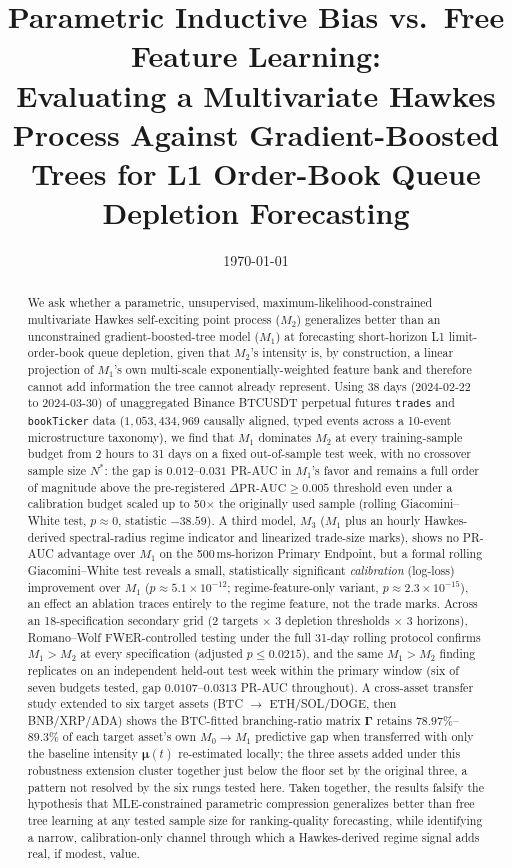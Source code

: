 \documentclass[11pt]{article}
\title{Parametric Inductive Bias vs.\ Free Feature Learning:\\
Evaluating a Multivariate Hawkes Process Against Gradient-Boosted\\
Trees for L1 Order-Book Queue Depletion Forecasting}
\author{%
  \todo{Author name(s) and affiliation(s)}
}
\date{\today}
\newcommand{\PRAUC}{\mathrm{PR\text{-}AUC}}
\begin{document}
\maketitle

\begin{abstract}
We ask whether a parametric, unsupervised, maximum-likelihood-constrained
multivariate Hawkes self-exciting point process ($M_2$) generalizes better
than an unconstrained gradient-boosted-tree model ($M_1$) at forecasting
short-horizon L1 limit-order-book queue depletion, given that $M_2$'s
intensity is, by construction, a linear projection of $M_1$'s own
multi-scale exponentially-weighted feature bank and therefore cannot add
information the tree cannot already represent. Using 38 days
(2024-02-22 to 2024-03-30) of unaggregated Binance BTCUSDT perpetual
futures \texttt{trades} and \texttt{bookTicker} data ($1{,}053{,}434{,}969$
causally aligned, typed events across a 10-event microstructure taxonomy),
we find that $M_1$ dominates $M_2$ at every training-sample budget from
2 hours to 31 days on a fixed out-of-sample test week, with no crossover
sample size $N^{*}$: the gap is $0.012$--$0.031$ PR-AUC in $M_1$'s favor and
remains a full order of magnitude above the pre-registered
$\Delta\PRAUC \ge 0.005$ threshold even under a calibration budget scaled
up to 50$\times$ the originally used sample (rolling Giacomini--White test,
$p \approx 0$, statistic $-38.59$). A third model, $M_3$ ($M_1$ plus an
hourly Hawkes-derived spectral-radius regime indicator and linearized
trade-size marks), shows no PR-AUC advantage over $M_1$ on the
500\,ms-horizon Primary Endpoint, but a formal rolling
Giacomini--White test reveals a small, statistically significant
\emph{calibration} (log-loss) improvement over $M_1$ ($p \approx 5.1\times
10^{-12}$; regime-feature-only variant, $p \approx 2.3\times10^{-15}$), an
effect an ablation traces entirely to the regime feature, not the trade
marks. Across an 18-specification secondary grid (2 targets $\times$ 3
depletion thresholds $\times$ 3 horizons), Romano--Wolf FWER-controlled
testing under the full 31-day rolling protocol confirms $M_1 > M_2$ at
every specification (adjusted $p \le 0.0215$), and the same $M_1>M_2$
finding replicates on an independent held-out test week within the
primary window (six of seven budgets tested, gap $0.0107$--$0.0313$
PR-AUC throughout). A cross-asset transfer study extended to six
target assets (BTC $\to$ ETH/SOL/DOGE, then BNB/XRP/ADA) shows the
BTC-fitted branching-ratio matrix $\boldsymbol{\Gamma}$ retains
$78.97\%$--$89.3\%$ of each target asset's own $M_0\!\to\!M_1$
predictive gap when transferred with only the baseline intensity
$\boldsymbol{\mu}(t)$ re-estimated locally; the three assets added under
this robustness extension cluster together just below the floor set by
the original three, a pattern not resolved by the six rungs tested here.
Taken together, the results falsify the hypothesis that MLE-constrained
parametric compression generalizes better than free tree learning at any
tested sample size for ranking-quality forecasting, while identifying a
narrow, calibration-only channel through which a Hawkes-derived regime
signal adds real, if modest, value.
\end{abstract}











\end{document}
